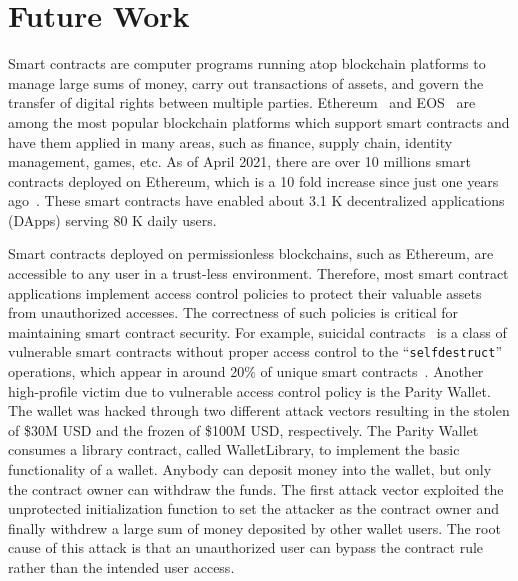 \chapter{Future Work}
\label{ch:futurework}



Smart contracts are computer programs running atop blockchain platforms to manage large sums of
money, carry out transactions of assets, and govern the transfer of digital rights between multiple
parties.
Ethereum~\cite{Ethereum} and EOS~\cite{EOS} are among the most popular blockchain platforms which
support smart contracts and have them applied in many areas, such as finance, supply chain,
identity management, games, etc.
As of April 2021, there are over 10 millions smart contracts deployed on Ethereum, which is a 10 fold
increase since just one years ago~\cite{Etherscan}.
These smart contracts have enabled about 3.1 K decentralized applications (DApps) serving 80 K
daily users.


Smart contracts deployed on permissionless blockchains, such as Ethereum, are accessible to any
user in a trust-less environment.
Therefore, most smart contract applications implement access control policies to protect their
valuable assets from unauthorized accesses.
The correctness of such policies is critical for maintaining smart contract security.
For example, suicidal contracts~\cite{nikolic2018finding} is a class of vulnerable smart contracts
without proper access control to the ``\texttt{selfdestruct}'' operations, which appear in around
20\% of unique smart contracts~\cite{oyente}.
Another high-profile victim due to vulnerable access control policy is the Parity Wallet.
The wallet was hacked through two different attack vectors resulting in the stolen of \$30M USD and
the frozen of \$100M USD, respectively.
The Parity Wallet consumes a library contract, called WalletLibrary, to implement the basic
functionality of a wallet.
Anybody can deposit money into the wallet, but only the contract owner can withdraw the funds.
The first attack vector exploited the unprotected initialization function to set the attacker as
the contract owner and finally withdrew a large sum of money deposited by other wallet users.
The root cause of this attack is that an unauthorized user can bypass the contract rule rather than
the intended user access.

